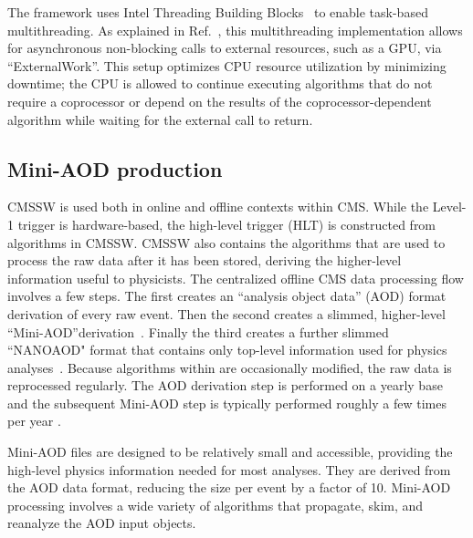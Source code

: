 The \CMSSW framework uses Intel Threading Building Blocks~\cite{tbb} to enable task-based multithreading. As explained in Ref.~\cite{Bocci:2020olh}, this multithreading implementation allows for asynchronous non-blocking calls to external resources, such as a GPU, via ``ExternalWork''. This setup optimizes CPU resource utilization by minimizing downtime; the CPU is allowed to continue executing algorithms that do not require a coprocessor or depend on the results of the coprocessor-dependent algorithm while waiting for the external call to return.

\subsection{Mini-AOD production}
\label{sec:miniaod_production}
CMSSW is used both in online and offline contexts within CMS. While the Level-1 trigger is hardware-based, the high-level trigger (HLT) is constructed from algorithms in CMSSW. CMSSW also contains the algorithms that are used to process the raw data after it has been stored, deriving the higher-level information useful to physicists. The centralized offline CMS data processing flow involves a few steps. The first creates an ``analysis object data'' (AOD) format derivation of every raw event. Then the second creates a slimmed, higher-level ``Mini-AOD''derivation~\cite{Petrucciani:2015gjw}. Finally the third creates a further slimmed ``NANOAOD" format that contains only top-level information used for physics analyses~\cite{Rizzi:2019rsi}. Because algorithms within \CMSSW are occasionally modified, the raw data is reprocessed regularly. The AOD derivation step is performed on a yearly base and the subsequent Mini-AOD step is typically performed roughly a few times per year .

Mini-AOD files are designed to be relatively small and accessible, providing the high-level physics information needed for most analyses. They are derived from the AOD data format, reducing the size per event by a factor of 10. Mini-AOD processing involves a wide variety of algorithms that propagate, skim, and reanalyze the AOD input objects. 